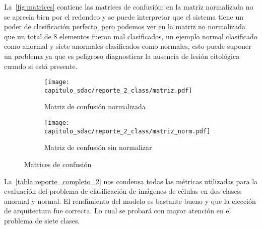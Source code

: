 \begin{table}[H]
    \centering
    \caption{Reporte de clasificación binario}\label{tabla:reporte_2}
    \end{table}

La~\autoref{fig:matrices} contiene las matrices de confusión; en la matriz
normalizada no se aprecia bien por el redondeo y se puede interpretar que el
sistema tiene un poder de clasificación perfecto, pero podemos ver en la matriz
no normalizada que un total de 8 elementos fueron mal clasificados, un ejemplo
normal clasificado como anormal y siete anormales clasificados como normales,
esto puede suponer un problema ya que es peligroso diagnosticar la ausencia de
lesión citológica cuando si está presente.

\begin{figure}[]
    \centering
    \begin{subfigure}[b]{0.7\textwidth}
        \centering 
        \texttt{[image: capitulo\_sdac/reporte\_2\_class/matriz.pdf]}
        \caption{Matriz de confusión normalizada}\label{fig:matriz_norm}
        \end{subfigure}
    \begin{subfigure}[b]{0.7\textwidth}
        \centering 
        \texttt{[image: capitulo\_sdac/reporte\_2\_class/matriz\_norm.pdf]}
        \caption{Matriz de confusión sin normalizar}\label{fig:matriz_sin}
    \end{subfigure}%
        \caption{Matrices de confusión}\label{fig:matrices}
\end{figure}
    
La~\autoref{tabla:reporte_completo_2} nos condensa todas las métricas utilizadas
para la evaluación del problema de clasificación de imágenes de células en dos
clases: anormal y normal. El rendimiento del modelo es bastante bueno y que la
elección de arquitectura fue correcta. Lo cual se probará con mayor atención en
el problema de siete clases. 

